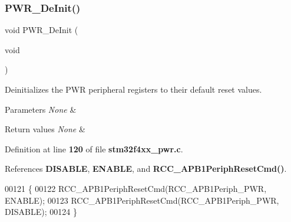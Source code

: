 \subsubsection{P\+W\+R\+\_\+\+De\+Init()}
{\footnotesize\ttfamily void P\+W\+R\+\_\+\+De\+Init (\begin{DoxyParamCaption}\item[{void}]{ }\end{DoxyParamCaption})}



Deinitializes the P\+WR peripheral registers to their default reset values. 


\begin{DoxyParams}{Parameters}
{\em None} & \\
\hline
\end{DoxyParams}

\begin{DoxyRetVals}{Return values}
{\em None} & \\
\hline
\end{DoxyRetVals}


Definition at line \textbf{ 120} of file \textbf{ stm32f4xx\+\_\+pwr.\+c}.



References \textbf{ D\+I\+S\+A\+B\+LE}, \textbf{ E\+N\+A\+B\+LE}, and \textbf{ R\+C\+C\+\_\+\+A\+P\+B1\+Periph\+Reset\+Cmd()}.


\begin{DoxyCode}
00121 \{
00122   RCC_APB1PeriphResetCmd(RCC_APB1Periph_PWR, ENABLE);
00123   RCC_APB1PeriphResetCmd(RCC_APB1Periph_PWR, DISABLE);
00124 \}
\end{DoxyCode}
